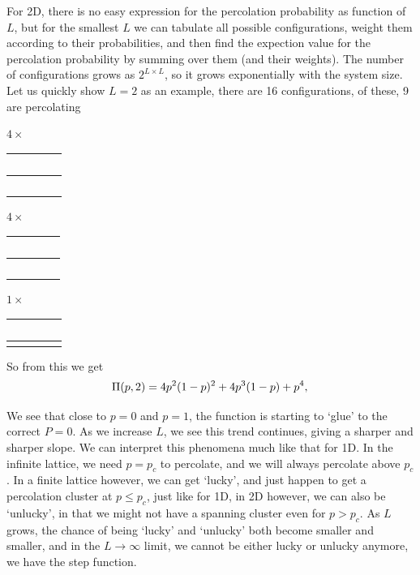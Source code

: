 \documentclass[a4paper, 11pt, notitlepage, english]{article}
\begin{document}
For 2D, there is no easy expression for the percolation probability as function of $L$, but for the smallest $L$ we can tabulate all possible configurations, weight them according to their probabilities, and then find the expection value for the percolation probability by summing over them (and their weights). The number of configurations grows as $2^{L\times L}$, so it grows exponentially with the system size. Let us quickly show $L=2$ as an example, there are 16 configurations, of these, 9 are percolating

\begin{center}
$4\times$
\begin{tabular}{|c|c|}
  \hline
  \ \ \cellcolor{black}&  \ \ \  \\ \hline
  \ \ \cellcolor{black} & \qquad \\
  \hline
\end{tabular} \qquad
\qquad $4\times$
\begin{tabular}{|c|c|}
  \hline
  \  \cellcolor{black} & \cellcolor{black} \ \ \  \\ \hline
  \ \  \cellcolor{black} & \qquad \\
  \hline
\end{tabular} \qquad 
\qquad $1\times$
\begin{tabular}{|c|c|}
  \hline
  \ \ \cellcolor{black} & \cellcolor{black} \ \ \  \\ \hline
  \cellcolor{black} & \cellcolor{black} \qquad \\
  \hline
\end{tabular}	
\end{center}
So from this we get
$$\Pi(p, 2) = 4p^2(1-p)^2 + 4p^3(1-p) + p^4, \\$$

We see that close to $p=0$ and $p=1$, the function is starting to `glue' to the correct $P=0$. As we increase $L$, we see this trend continues, giving a sharper and sharper slope. We can interpret this phenomena much like that for 1D. In the infinite lattice, we need $p=p_c$ to percolate, and we will always percolate above $p_c$. In a finite lattice however, we can get `lucky', and just happen to get a percolation cluster at $p \leq p_c$, just like for 1D, in 2D however, we can also be `unlucky', in that we might not have a spanning cluster even for $p > p_c$. As $L$ grows, the chance of being `lucky' and `unlucky' both become smaller and smaller, and in the $L\to \infty$ limit, we cannot be either lucky or unlucky anymore, we have the step function.
\end{document}
